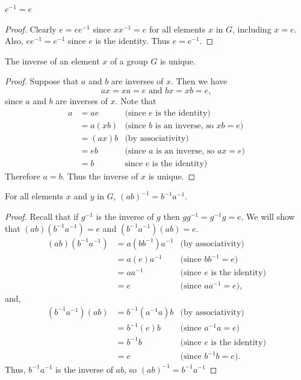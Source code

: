 \newpage

\begin{proposition}
    $e^{-1} = e$
\end{proposition}
\begin{proof}
    Clearly $e = ee^{-1}$ since $xx^{-1} = e$ for all elements $x$ in $G$, including $x = e$. Also, $ee^{-1} = e^{-1}$ since $e$ is the identity. Thus $e = e^{-1}$.
\end{proof}

\begin{proposition}
    The inverse of an element $x$ of a group $G$ is unique.
\end{proposition}
\begin{proof}
    Suppose that $a$ and $b$ are inverses of $x$. Then we have
    \[
        ax = xa = e \text{ and } bx = xb = e,
    \]
    since $a$ and $b$ are inverses of $x$. Note that
    \begin{align*}
        a &= ae & \text{(since } e \text{ is the identity)}\\
        &= a(xb) & \text{(since } b \text{ is an inverse, so } xb = e \text{)}\\
        &= (ax)b & \text{(by associativity)}\\
        &= eb & \text{(since } a \text{ is an inverse, so } ax = e \text{)}\\
        &= b & \text{since } e \text{ is the identity)}
    \end{align*}
    Therefore $a = b$. Thus the inverse of $x$ is unique.
\end{proof}

\begin{proposition}
    For all elements $x$ and $y$ in $G$, $(ab)^{-1} = b^{-1}a^{-1}$.
\end{proposition}
\begin{proof}
    Recall that if $g^{-1}$ is the inverse of $g$ then $gg^{-1} = g^{-1}g = e$. We will show that $(ab)(b^{-1}a^{-1}) = e$ and $(b^{-1}a^{-1})(ab) = e$.
    \begin{align*}
        (ab)(b^{-1}a^{-1}) &= a(bb^{-1})a^{-1} & \text{(by associativity)}\\
        &= a(e)a^{-1} & \text{(since } bb^{-1} = e\text{)}\\
        &= aa^{-1} & \text{(since } e \text{ is the identity)}\\
        &= e & \text{(since } aa^{-1} = e\text{)},
    \end{align*}
    and,
    \begin{align*}
        (b^{-1}a^{-1})(ab) &= b^{-1}(a^{-1}a)b & \text{(by associativity)}\\
        &= b^{-1}(e)b & \text{(since } a^{-1}a = e\text{)}\\
        &= b^{-1}b & \text{(since } e \text{ is the identity)}\\
        &= e & \text{(since } b^{-1}b = e\text{)}.
    \end{align*}
    Thus, $b^{-1}a^{-1}$ is the inverse of $ab$, so $(ab)^{-1} = b^{-1}a^{-1}$
\end{proof}

